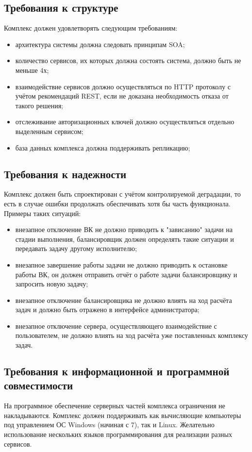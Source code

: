 \documentclass[a4paper,12pt]{report}
\numberwithin{equation}{section}
\begin{document}
\subsection{Требования к структуре}
Комплекс должен удовлетворять следующим требованиям:
\begin{itemize}
  \item архитектура системы должна следовать принципам SOA;
  \item количество сервисов, их которых должна состоять система, должно быть не меньше 4х;
  \item взаимодействие сервисов должно осуществляться по HTTP протоколу с учётом рекомендаций REST, если не доказана необходимость отказа от такого решения;
  \item отслеживание авторизационных ключей должно осуществляться отдельно выделенным сервисом;
  \item база данных комплекса должна поддерживать репликацию; 
\end{itemize}

\subsection{Требования к надежности}
Комплекс должен быть спроектирован с учётом контролируемой деградации, то есть в случае ошибки продолжать обеспечивать хотя бы часть функционала. Примеры таких ситуаций:
\begin{itemize}
  \item внезапное отключение ВК не должно приводить к "зависанию" задачи на стадии выполнения, балансировщик должен определять такие ситуации и передавать задачу другому исполнителю;
  \item внезапное завершение работы задачи не должно приводить к остановке работы ВК, он должен отправить отчёт о работе задачи балансировщику и запросить новую задачу;
  \item внезапное отключение балансировщика не должно влиять на ход расчёта задач и должно быть отражено в интерфейсе администратора;
  \item внезапное отключение сервера, осуществляющего взаимодействие с пользователем, не должно влиять на ход расчёта уже поставленных комплексу задач.
\end{itemize}

\subsection{Требования к информационной и программной совместимости}
На программное обеспечение серверных частей комплекса ограничения не накладываются.
Комплекс должен поддерживать как вычисляющие компьютеры под управлением ОС Windows (начиная с 7), так и Linux.
Желательно использование нескольких языков программирования для реализации разных сервисов.
\end{document}
